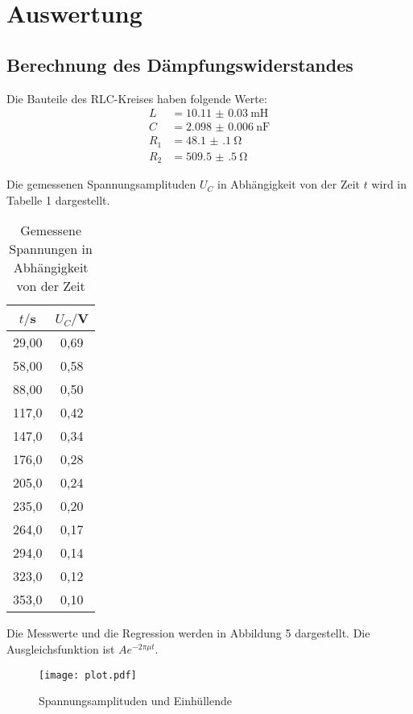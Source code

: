 \section{Auswertung}
\label{sec:Auswertung}



\subsection{Berechnung des Dämpfungswiderstandes}

Die Bauteile des RLC-Kreises haben folgende Werte:
\begin{align*}
  L &= \SI{10.11(3)}{\milli\henry} \\
  C &= \SI{2.098(6)}{\nano\farad} \\
  R_1 &= \SI{48.1(1)}{\ohm} \\
  R_2 &= \SI{509.5(5)}{\ohm}
\end{align*}

Die gemessenen Spannungsamplituden $U_C$ in Abhängigkeit von der Zeit $t$ wird in Tabelle 1 dargestellt.

\begin{table}[H]
  \centering
  \caption{Gemessene Spannungen in Abhängigkeit von der Zeit}
  \label{tab:Spannungsamplitude}
  \begin{tabular}{c c}
    \toprule
    $t/$s & $U_C/$V \\
    \midrule
    29,00 & 0,69 \\
    58,00 & 0,58 \\
    88,00 & 0,50 \\
    117,0 & 0,42 \\
    147,0 & 0,34 \\
    176,0 & 0,28 \\
    205,0 & 0,24 \\
    235,0 & 0,20 \\
    264,0 & 0,17 \\
    294,0 & 0,14 \\
    323,0 & 0,12 \\
    353,0 & 0,10 \\
    \bottomrule
  \end{tabular}
\end{table}

Die Messwerte und die Regression werden in Abbildung 5 dargestellt. Die Ausgleichsfunktion ist $Ae^{-2\pi \mu t}$.

\begin{figure}[H]
  \centering
  \texttt{[image: plot.pdf]}
  \caption{Spannungsamplituden und Einhüllende}
  \label{fig:plot}
\end{figure}

